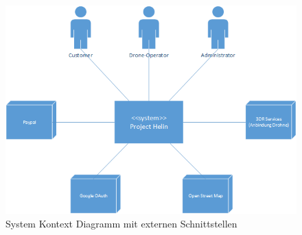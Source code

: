 \begin{figure}[h]
\includegraphics[width=1.0\textwidth]{images/system-context-diagram.png}
\caption{System Kontext Diagramm mit externen Schnittstellen }
\label{fig:system-context-diagram}
\end{figure}









